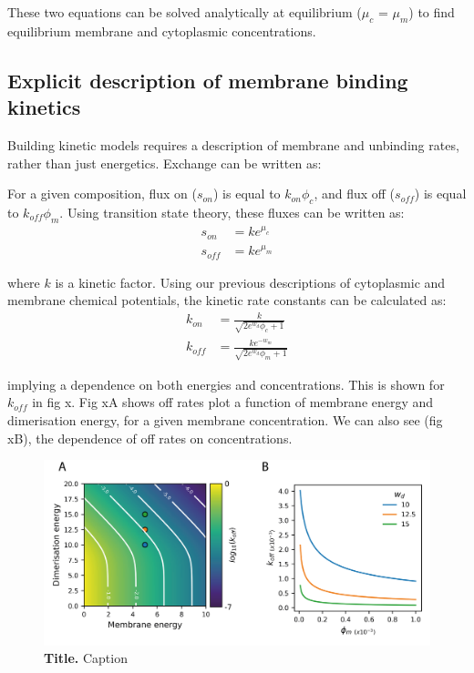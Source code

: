 \documentclass[12pt]{"report"}
\newcommand{\mycaption}[2]{\caption[#1]{\textbf{#1.} #2}}
\begin{document}
These two equations can be solved analytically at equilibrium ($\mu_c$ = $\mu_m$) to find equilibrium membrane and cytoplasmic concentrations.


\subsection{Explicit description of membrane binding kinetics} 

Building kinetic models requires a description of membrane and unbinding rates, rather than just energetics. Exchange can be written as:

\begin{center}
\end{center}

For a given composition, flux on ($s_{on}$) is equal to $k_{on}\phi_c$, and flux off ($s_{off}$) is equal to $k_{off}\phi_m$. Using transition state theory, these fluxes can be written as:
\begin{align}
s_{on} &= ke^{\mu_c}\\
s_{off} &= ke^{\mu_m}
\end{align}

where $k$ is a kinetic factor. Using our previous descriptions of cytoplasmic and membrane chemical potentials, the kinetic rate constants can be calculated as:
\begin{align}
k_{on} &= \frac{k}{\sqrt{2e^{w_d}\phi_c+ 1}}\\
k_{off} &= \frac{ke^{-w_m}}{\sqrt{2e^{w_d}\phi_m+ 1}}
\end{align}

implying a dependence on both energies and concentrations. This is shown for $k_{off}$ in fig x. Fig xA shows off rates plot a function of membrane energy and dimerisation energy, for a given membrane concentration. We can also see (fig xB), the dependence of off rates on concentrations.

\begin{figure}[!h]
\includegraphics[scale=1]{thermodynamic_model_koff}
\setlength{\abovecaptionskip}{20pt}
\centering
\mycaption{Title}{Caption}
\label{fig:thermodynamic_model_koff}
\end{figure}
\end{document}
